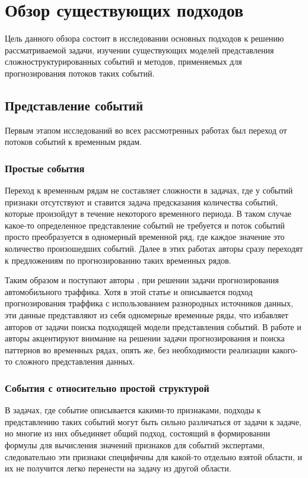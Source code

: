 \section{Обзор существующих подходов}
Цель данного обзора состоит в исследовании основных подходов к решению рассматриваемой задачи, изучении существующих моделей представления сложноструктурированных событий и методов, применяемых для прогнозирования потоков таких событий.

\subsection{Представление событий}
Первым этапом исследований во всех рассмотренных работах был переход от потоков событий к временным рядам.

\subsubsection{Простые события}\label{no_struct_events}
Переход к временным рядам не составляет сложности в задачах, где у событий признаки отсутствуют и ставится задача предсказания количества событий, которые произойдут в течение некоторого временного периода. В таком случае какое-то определенное представление событий не требуется и поток событий просто преобразуется в одномерный временной ряд, где каждое значение это количество произошедших событий. Далее в этих работах авторы сразу переходят к предложениям по прогнозированию таких временных рядов.

Таким образом и поступают авторы \cite{traffic_flow_forecasting}, при решении задачи прогнозирования автомобильного траффика. Хотя в этой статье и описывается подход прогнозирования траффика с использованием разнородных источников данных, эти данные представляют из себя одномерные временные ряды, что избавляет авторов от задачи поиска подходящей модели представления событий. В работе \cite{modeling_patterns_with_DNN} и \cite{predictive_monitoring_LSTM} авторы акцентируют внимание на решении задачи прогнозирования и поиска паттернов во временных рядах, опять же, без необходимости реализации какого-то сложного представления данных.

\subsubsection{События с относительно простой структурой} \label{simple_struct_events}
В задачах, где событие описывается какими-то признаками, подходы к представлению таких событий могут быть сильно различаться от задачи к задаче, но многие из них объединяет общий подход, состоящий в формировании формулы для вычисления значений признаков для событий экспертами, следовательно эти признаки специфичны для какой-то отдельно взятой области, и их не получится легко перенести на задачу из другой области.

